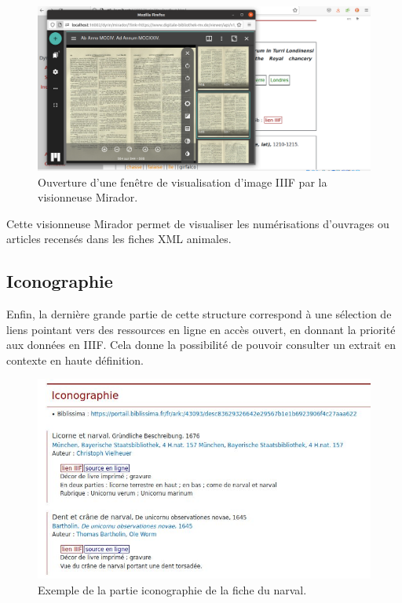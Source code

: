 \documentclass[a4paper,12pt,twoside]{book}
\begin{document}
\begin{figure}[H]
    \centering
    \includegraphics[width=\linewidth]{img/partie_3/mirador.png}
    \caption{Ouverture d'une fenêtre de visualisation d'image \acrshort{IIIF} par la visionneuse Mirador.}
    \label{mirador-iiif}
\end{figure}

Cette visionneuse Mirador permet de visualiser les numérisations d'ouvrages ou articles recensés dans les fiches \acrshort{XML} animales.

\subsection{Iconographie}
Enfin, la dernière grande partie de cette structure correspond à une sélection de liens pointant vers des ressources en ligne en accès ouvert, en donnant la priorité aux données en \acrshort{IIIF}. Cela donne la possibilité de pouvoir consulter un extrait en contexte en haute définition.

\begin{figure}[H]
    \centering
    \includegraphics[width=12cm]{img/partie_3/icono.JPG}
    \caption{Exemple de la partie iconographie de la fiche du narval.}
    \label{icono}
\end{figure}
\end{document}
